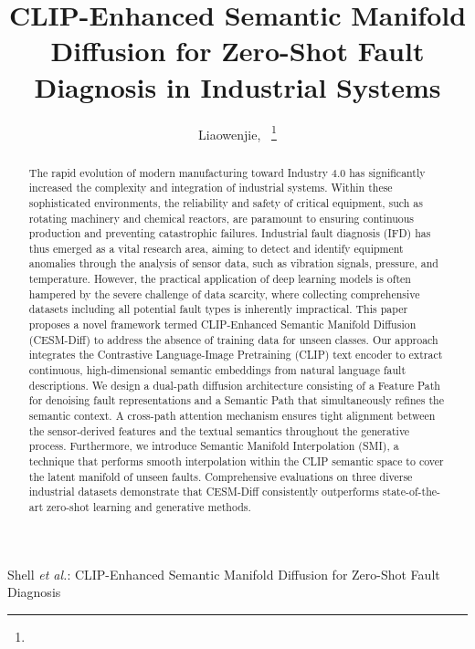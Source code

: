 \documentclass[journal]{IEEEtran}
\begin{document}
\title{CLIP-Enhanced Semantic Manifold Diffusion for Zero-Shot Fault Diagnosis in Industrial Systems}

\author{Liaowenjie,~\IEEEmembership{}%
\thanks{}}

%
{Shell \MakeLowercase{\textit{et al.}}: CLIP-Enhanced Semantic Manifold Diffusion for Zero-Shot Fault Diagnosis}

\maketitle

\begin{abstract}
The rapid evolution of modern manufacturing toward Industry 4.0 has significantly increased the complexity and integration of industrial systems. Within these sophisticated environments, the reliability and safety of critical equipment, such as rotating machinery and chemical reactors, are paramount to ensuring continuous production and preventing catastrophic failures. Industrial fault diagnosis (IFD) has thus emerged as a vital research area, aiming to detect and identify equipment anomalies through the analysis of sensor data, such as vibration signals, pressure, and temperature. However, the practical application of deep learning models is often hampered by the severe challenge of data scarcity, where collecting comprehensive datasets including all potential fault types is inherently impractical. This paper proposes a novel framework termed CLIP-Enhanced Semantic Manifold Diffusion (CESM-Diff) to address the absence of training data for unseen classes. Our approach integrates the Contrastive Language-Image Pretraining (CLIP) text encoder to extract continuous, high-dimensional semantic embeddings from natural language fault descriptions. We design a dual-path diffusion architecture consisting of a Feature Path for denoising fault representations and a Semantic Path that simultaneously refines the semantic context. A cross-path attention mechanism ensures tight alignment between the sensor-derived features and the textual semantics throughout the generative process. Furthermore, we introduce Semantic Manifold Interpolation (SMI), a technique that performs smooth interpolation within the CLIP semantic space to cover the latent manifold of unseen faults. Comprehensive evaluations on three diverse industrial datasets demonstrate that CESM-Diff consistently outperforms state-of-the-art zero-shot learning and generative methods.
\end{abstract}
\end{document}
